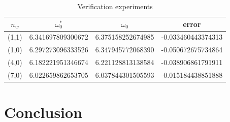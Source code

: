 \documentclass[12pt]{article}
\begin{document}
\begin{table}
\caption{Verification experiments}
\label{tab:km}
\begin{center}
\begin{tabular}{c|c|c|c}
$n_w$ & $\omega_0^*$ & $\omega_0$ & error \\ \hline 
(1,1) &      6.341697809300672 &   6.375158252674985 &  -0.033460443374313 \\
(1,0) &     6.297273096333526 	&   6.347945772068390 &  -0.050672675734864	\\
(4,0) &    6.182221951346674 &   6.221128813138584 &  -0.038906861791911\\
(7,0) &    6.022659862653705&   6.037844301505593 &	  -0.015184438851888
\end{tabular}
\end{center}
\end{table}


\section{Conclusion}
\end{document}
